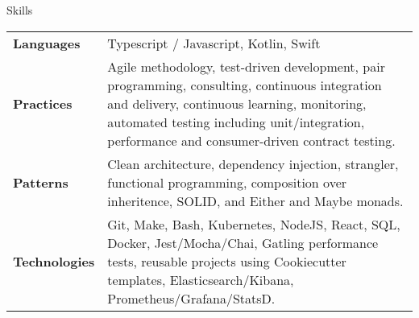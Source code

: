 \begin{section}{Skills}
  \begin{tabularx}{\linewidth}{@{}l X@{}}
    \textbf{Languages} &\small{Typescript / Javascript, Kotlin, Swift} \\
    \textbf{Practices} &\small{Agile methodology, test-driven development, pair programming, consulting, continuous integration and delivery, continuous learning, monitoring, automated testing including unit/integration, performance and consumer-driven contract testing.} \\
    \textbf{Patterns} &\small{Clean architecture, dependency injection, strangler, functional programming, composition over inheritence, SOLID, and Either and Maybe monads.} \\
    \textbf{Technologies} &\small{Git, Make, Bash, Kubernetes, NodeJS, React, SQL, Docker, Jest/Mocha/Chai, Gatling performance tests, reusable projects using Cookiecutter templates, Elasticsearch/Kibana, Prometheus/Grafana/StatsD.} \\ 
  \end{tabularx}
\end{section}
